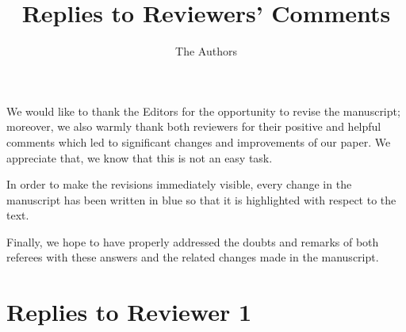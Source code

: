 \documentclass[11pt, executivepaper]{article}
\begin{document}
\title{\textbf{Replies to Reviewers' Comments}}

\author{The Authors}

\maketitle


\noindent We would like to thank the Editors for the opportunity to revise the manuscript; moreover, we also warmly thank both reviewers for their positive and helpful comments which led to significant changes and improvements of our paper. We appreciate that, we know that this is not an easy task.
\vspace{2mm}

In order to make the revisions immediately visible, every change in the manuscript has been written in blue so that it is highlighted with respect to the text. 
\vspace{2mm}

Finally, we hope to have properly addressed the doubts and remarks of both referees with these answers and the related changes made in the manuscript.

\section{Replies to Reviewer 1}
 
\end{document}
